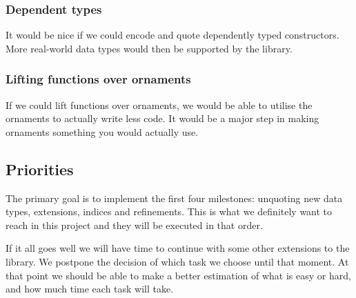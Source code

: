 \subsubsection{Dependent types}\label{sec:plan-deptypes}

It would be nice if we could encode and quote dependently typed
constructors.
More real-world data types would then be supported by the library.

\subsubsection{Lifting functions over ornaments}\label{sec:plan-lifting}

If we could lift functions over ornaments, we would be able to utilise
the ornaments to actually write less code.
It would be a major step in making ornaments something you would
actually use.

\subsection{Priorities}\label{sec:plan-priorities}

The primary goal is to implement the first four milestones: unquoting
new data types, extensions, indices and refinements.
This is what we definitely want to reach in this project and they will
be executed in that order.

If it all goes well we will have time to continue with some other
extensions to the library.
We postpone the decision of which task we choose until that moment.
At that point we should be able to make a better estimation of what is
easy or hard, and how much time each task will take.
